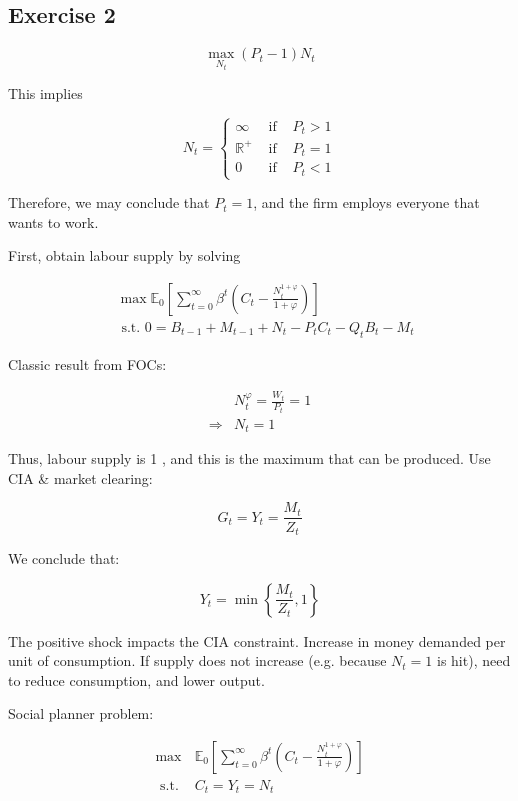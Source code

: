 {
\subsection*{Exercise 2}

\begin{enumerate}[label=(\alph*)]
{\item 
$$
\max _{N_{t}}\left(P_{t}-1\right) N_{t}
$$

This implies

$$
N_{t}=\left\{\begin{array}{lll}
\infty & \text { if } & P_{t} > 1 \\
\mathbb{R}^{+} & \text { if } & P_{t}=1 \\
0 & \text { if } & P_{t}<1
\end{array}\right.
$$

Therefore, we may conclude that $P_{t}=1$, and the firm employs everyone that wants to work.
}
{
\item 
First, obtain labour supply by solving

$$
\begin{aligned}
& \max \mathbb{E}_{0}\left[\sum_{t=0}^{\infty} \beta^{t}\left(C_{t}-\frac{N_{t}^{1+\varphi}}{1+\varphi}\right)\right] \\
& \text { s.t. } 0=B_{t-1}+M_{t-1}+N_{t}-P_{t} C_{t}-Q_{t} B_{t}-M_{t}
\end{aligned}
$$

Classic result from FOCs:

$$
\begin{aligned}
& N_{t}^{\varphi}=\frac{W_{t}}{P_{t}}=1 \\
\Rightarrow & N_{t}=1
\end{aligned}
$$

Thus, labour supply is 1 , and this is the maximum that can be produced. Use CIA \& market clearing:

$$
G_{t}=Y_{t}=\frac{M_{t}}{Z_{t}}
$$

We conclude that:

$$
Y_{t}=\min \left\{\frac{M_{t}}{Z_t}, 1\right\}
$$
}
{
\item 
The positive shock impacts the CIA constraint. Increase in money demanded per unit of consumption. If supply does not increase (e.g. because $N_{t}=1$ is hit), need to reduce consumption, and lower output.
}
{
\item 
Social planner problem:

$$
\begin{aligned}
\max & \mathbb{E}_{0}\left[ \sum_{t=0}^{\infty} \beta^{t}\left(C_{t}-\frac{N_{t}^{1+\varphi}}{1+\varphi}\right)\right] \\
\text { s.t. } & C_{t}=Y_{t}=N_{t}
\end{aligned}
$$

}
\end{enumerate}}
